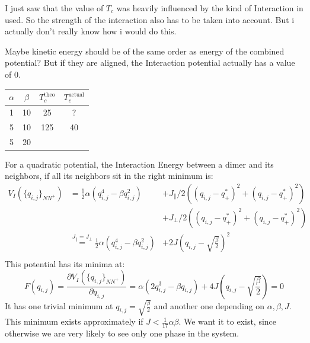 	I just saw that the value of $T_c$ was heavily influenced by the kind of Interaction in used. So the strength of the interaction also has to be taken into account. But i actually don't really know how i would do this.
	
	Maybe kinetic energy should be of the same order as energy of the combined potential?
	But if they are aligned, the Interaction potential actually has a value of 0.
	
	\begin{center}
		\begin{tabular}{c|c|c|c}
			\centering
			$\alpha$ & $\beta$ & $T_c^{\text{theo}}$ & $T_c^{\text{actual}}$ \\  [0.5ex]
			\hline
			1 & 10 & 25 & ?	\\
			5 & 10 & 125 & 40 \\
			5 & 20 &
		\end{tabular}
	\end{center}
	
	For a quadratic potential, the Interaction Energy between a dimer and its neighbors, if all its neighbors sit in the right minimum is:
	\begin{equation}
		\begin{split}
			V_I (\lbrace q_{i, j} \rbrace_{NN^+}) &= \frac{1}{2}	\alpha \left(q_{i, j}^4 - \beta q_{i, j}^2 \right)&+ J_{\parallel}/2 \left(\left( q_{i, j} - q^*_+   \right)^2 + \left(q_{i, j} - q^*_+\right)^2 \right)\\
			&~&+ J_{\perp}/2 \left(\left( q_{i, j} - q^*_+   \right)^2 + \left(    q_{i, j} - q^*_+\right)^2 \right)\\
			&\overset{J_\parallel =	J_\perp}{=} \frac{1}{2}	\alpha \left(q_{i, j}^4 - \beta q_{i, j}^2 \right)&+ 2J \left( q_{i, j} -\sqrt{\frac{\beta}{2}}   \right)^2 \\
		\end{split}
	\end{equation}
	This potential has its minima at:
	\begin{equation}
		F(q_{i, j}) =	\frac{\partial 	V_I (\lbrace q_{i, j} \rbrace_{NN^+})}{\partial q_{i, j}} =	\alpha \left(2q_{i, j}^3 - \beta q_{i, j} \right) + 4 J	\left( q_{i, j} -\sqrt{\frac{\beta}{2}}   \right) =	0
	\end{equation}
	It has one trivial minimum at $q_{i, j} = \sqrt{\frac{\beta}{2}}$ and another one depending on $\alpha, \beta, J$. This minimum exists approximately if $J < \frac{1}{17} 	\alpha  \beta$. We want it to exist, since otherwise we are very likely to see only one phase in the system.
	
